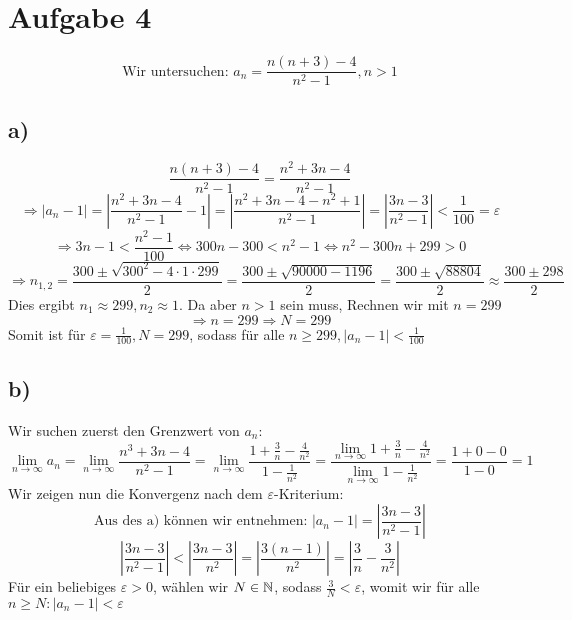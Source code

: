 \section{Aufgabe 4}
    $$\text{Wir untersuchen: }a_n=\frac{n(n+3)-4}{n^2-1}, n>1$$
    \subsection{a)} 
        $$\frac{n(n+3)-4}{n^2-1}=\frac{n^2+3n-4}{n^2-1}$$
        $$\Rightarrow |a_n-1|=|\frac{n^2+3n-4}{n^2-1}-1|=|\frac{n^2+3n-4-n^2+1}{n^2-1}|=|\frac{3n-3}{n^2-1}|<\frac{1}{100}=\varepsilon$$
        $$\Rightarrow 3n-1<\frac{n^2-1}{100}\Leftrightarrow 300n-300<n^2-1\Leftrightarrow n^2-300n+299>0$$
        $$\Rightarrow n_{1,2} = \frac{300\pm\sqrt{300^2-4\cdot1\cdot299}}{2}=\frac{300\pm\sqrt{90000-1196}}{2}=\frac{300\pm\sqrt{88804}}{2}\approx\frac{300\pm298}{2}$$
        Dies ergibt $n_1\approx299,n_2\approx1$. Da aber $n>1$ sein muss, Rechnen wir mit $n=299$ \\
        $$\Rightarrow n=299 \Rightarrow N = 299$$
        Somit ist für $\varepsilon=\frac{1}{100}, N=299$, sodass für alle $n\geq299, |a_n-1|<\frac{1}{100}$
    \subsection{b)}
        Wir suchen zuerst den Grenzwert von $a_n$:
        $$\lim_{n\to\infty}a_n=\lim_{n\to\infty}\frac{n^3+3n-4}{n^2-1}=\lim_{n\to\infty}\frac{1+\frac{3}{n}-\frac{4}{n^2}}{1-\frac{1}{n^2}}=\frac{\lim_{n\to\infty}1+\frac{3}{n}-\frac{4}{n^2}}{\lim_{n\to\infty}1-\frac{1}{n^2}}=\frac{1+0-0}{1-0}=1$$
        Wir zeigen nun die Konvergenz nach dem $\varepsilon$-Kriterium:
        $$\text{Aus des a) können wir entnehmen: }|a_n-1|=|\frac{3n-3}{n^2-1}|$$
        $$|\frac{3n-3}{n^2-1}|<|\frac{3n-3}{n^2}|=|\frac{3(n-1)}{n^2}|=|\frac{3}{n}-\frac{3}{n^2}|$$
        Für ein beliebiges $\varepsilon>0$, wählen wir $N \in \mathbb{N}$, sodass $\frac{3}{N}<\varepsilon$, womit wir für alle $n\geq N:|a_n-1|<\varepsilon$